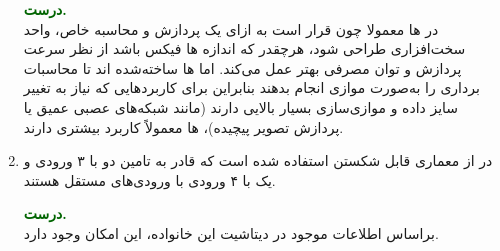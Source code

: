 \begin{enumerate}
	\begin{qsolve}
		\textbf{\textcolor{darkgreen}{درست.}}\\
		در  ها معمولا چون قرار است به ازای یک پردازش و محاسبه خاص، واحد سخت‌افزاری طراحی شود، هرچقدر که اندازه ها فیکس باشد از نظر سرعت پردازش و توان مصرفی بهتر عمل می‌کند. اما  ها ساخته‌شده اند تا محاسبات برداری را به‌صورت موازی انجام بدهند بنابراین برای کاربردهایی که نیاز به تغییر سایز داده و موازی‌سازی بسیار بالایی دارند (مانند شبکه‌های عصبی عمیق یا پردازش تصویر پیچیده)، ها معمولاً کاربرد بیشتری دارند.
	\end{qsolve}
	
	
	\item 
	در  از معماری  قابل شکستن استفاده شده است که قادر به تامین دو  با ۳ ورودی و یک  با ۴ ورودی با ورودی‌های مستقل هستند.
	
	\begin{qsolve}
		\textbf{\textcolor{darkgreen}{درست.}}\\
		براساس اطلاعات موجود در دیتاشیت این خانواده، این امکان وجود دارد.
	\end{qsolve}
	
\end{enumerate}